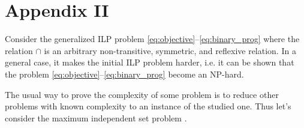 \chapter{Appendix II}
\label{sec:gen_ilp_is_np_hard}

Consider the generalized ILP problem \eqref{eq:objective}--\eqref{eq:binary_prog} where
the relation \( \cap \) is an arbitrary non-transitive, symmetric, and reflexive relation.
In a general case, it makes the initial ILP problem harder, i.e. it can be shown that the problem
\eqref{eq:objective}--\eqref{eq:binary_prog} become an NP-hard.

The usual way to prove the complexity of some problem is to reduce other problems with known complexity to
an instance of the studied one. Thus let's consider the maximum independent set problem \cite{pemmaraju2003computational}.

